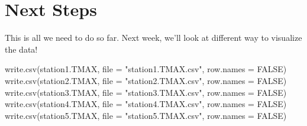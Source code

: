 \documentclass{article}\usepackage[]{graphicx}\usepackage[]{xcolor}
\begin{document}
\section{Next Steps}

This is all we need to do so far. Next week, we'll look at different way to visualize the data!


write.csv(station1.TMAX, file = "station1.TMAX.csv", row.names = FALSE)
write.csv(station2.TMAX, file = "station2.TMAX.csv", row.names = FALSE)
write.csv(station3.TMAX, file = "station3.TMAX.csv", row.names = FALSE)
write.csv(station4.TMAX, file = "station4.TMAX.csv", row.names = FALSE)
write.csv(station5.TMAX, file = "station5.TMAX.csv", row.names = FALSE)
\end{document}
